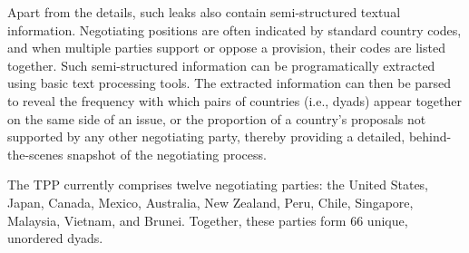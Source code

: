 \documentclass[12pt]{article}
\begin{document}
Apart from the details, such leaks also contain semi-structured textual information. 
Negotiating positions are often indicated by standard country codes, and when multiple parties 
support or oppose a provision, their codes are listed together. Such semi-structured information 
can be programatically extracted using basic text processing tools. 
The extracted information can then be 
parsed to reveal the frequency with which pairs of countries (i.e., dyads) appear together on the same 
side of an issue, 
or the proportion of a country's proposals not supported by any other negotiating party, thereby 
providing a detailed, behind-the-scenes snapshot of the negotiating process.

The TPP currently comprises twelve negotiating parties: the United States, Japan, Canada, Mexico, 
Australia, New Zealand, Peru, Chile, Singapore, Malaysia, Vietnam, and Brunei. Together, 
these parties form 66 
unique, unordered dyads. 
% 
\end{document}
